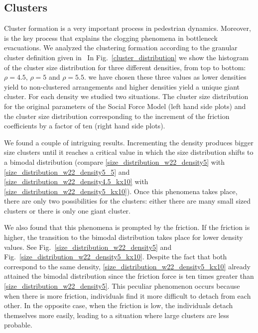 \subsection{\label{clusters}Clusters}

Cluster formation is a very important process in pedestrian dynamics. Moreover, is the key process that explains the clogging phenomena in bottleneck evacuations. We analyzed the clustering formation according to the granular cluster definition given in~\cite{Dorso1}
In Fig.~\ref{cluster_distribution} we show the histogram of the cluster size distribution for three different densities, from top to bottom: $\rho=4.5$, $\rho=5$ and $\rho=5.5$. we have chosen these three values as lower densities yield to non-clustered arrangements and higher densities yield a unique giant cluster.     
For each density we studied two situations. The cluster size distribution for the original parameters of the Social Force Model (left hand side plots) and the cluster size distribution corresponding to the increment of the friction coefficients by a factor of ten (right hand side plots).

We found a couple of intriguing results. Incrementing the density produces bigger size clusters until it reaches a critical value in which the size distribution shifts to a bimodal distribution (compare \ref{size_distribution_w22_density5} with \ref{size_distribution_w22_density5_5} and \ref{size_distribution_w22_density4.5_kx10} with \ref{size_distribution_w22_density5_kx10}). Once this phenomena takes place, there are only two possibilities for the clusters: either there are many small sized clusters or there is only one giant cluster.

We also found that this phenomena is prompted by the friction. If the friction is higher, the transition to the bimodal distribution takes place for lower density values. See Fig.~\ref{size_distribution_w22_density5} and Fig.~\ref{size_distribution_w22_density5_kx10}. Despite the fact that both correspond to the same density,  \ref{size_distribution_w22_density5_kx10} already attained the bimodal distribution since the friction force is ten times greater than \ref{size_distribution_w22_density5}. This peculiar phenomenon occurs because when there is more friction, individuals find it more difficult to detach from each other. In the opposite case, when the friction is low, the individuals detach themselves more easily, leading to a situation where large clusters are less probable.

